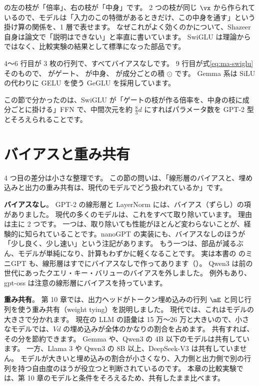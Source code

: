 の左の枝が「倍率」、右の枝が「中身」です。
2 つの枝が同じ $\vx$ から作られているので、モデルは「入力のこの特徴があるときだけ、この中身を通す」という掛け算の関係を、1 層で表せます。
なぜこれがよく効くのかについて、Shazeer 自身は論文で「説明はできない」と率直に書いています\cite{shazeer2020glu}。
SwiGLU は理論からではなく、比較実験の結果として標準になった部品です。


4〜6 行目が 3 枚の行列で、すべてバイアスなしです。
9 行目が式\eqref{eq:ma-swiglu}そのもので、 がゲート、 が中身、\code{*} が成分ごとの積 $\odot$ です。
Gemma 系は SiLU の代わりに GELU を使う GeGLU を採用しています。

この節で分かったのは、SwiGLU が「ゲートの枝が作る倍率を、中身の枝に成分ごとに掛ける」FFN で、中間次元を約 $\tfrac83 d$ にすればパラメータ数を GPT-2 型とそろえられることです。

\section{バイアスと重み共有}\label{sec:ma-bias}

4 つ目の差分は小さな整理です。
この節の問いは、「線形層のバイアスと、埋め込みと出力の重み共有は、現代のモデルでどう扱われているか」です。

\textbf{バイアスなし}。
GPT-2 の線形層と LayerNorm には、バイアス（ずらし）の項がありました。
現代の多くのモデルは、これをすべて取り除いています。
理由は主に 2 つです。
一つは、取り除いても性能がほとんど変わらないことが、経験的に知られていることです。nanoGPT の実装にも、バイアスなしのほうが「少し良く、少し速い」という注記があります\cite{karpathy2022nanogpt}。
もう一つは、部品が減るぶん、モデルが単純になり、計算もわずかに軽くなることです。
実は本書の  のミニGPT も、線形層はすでにバイアスなしで作ってあります（）。
Qwen3 は前の世代にあったクエリ・キー・バリューのバイアスを外しました\cite{yang2025qwen3}。
例外もあり、gpt-oss は注意の線形層にバイアスを持っています。

\textbf{重み共有}。
第 10 章では、出力ヘッドがトークン埋め込みの行列 $\mE$ と同じ行列を使う重み共有（weight tying）\cite{press2017using}を説明しました。
現代では、これはモデルの大きさで分かれます。
現在の LLM の語彙は 15 万〜26 万と大きいので、小さなモデルでは、$Vd$ の埋め込みが全体のかなりの割合を占めます。
共有すれば、その分を節約できます。
Gemma や、Qwen3 の 4B 以下のモデルは共有しています。
一方、Llama 3 や Qwen3 の 8B 以上、DeepSeek-V3 は共有していません。
モデルが大きいと埋め込みの割合が小さくなり、入力側と出力側で別の行列を持つ自由度のほうが役立つと判断されているのです。
本章の比較実験では、第 10 章のモデルと条件をそろえるため、共有したまま比べます。

